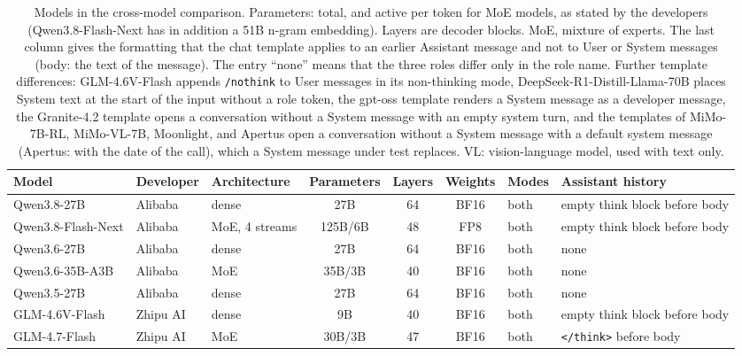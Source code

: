 
\begin{table}[htbp]
\centering
\caption{Models in the cross-model comparison. Parameters: total, and active per token for MoE models, as stated by the developers (Qwen3.8-Flash-Next has in addition a 51B n-gram embedding). Layers are decoder blocks. MoE, mixture of experts. The last column gives the formatting that the chat template applies to an earlier Assistant message and not to User or System messages (body: the text of the message). The entry ``none'' means that the three roles differ only in the role name. Further template differences: GLM-4.6V-Flash appends \texttt{/nothink} to User messages in its non-thinking mode, DeepSeek-R1-Distill-Llama-70B places System text at the start of the input without a role token, the gpt-oss template renders a System message as a developer message, the Granite-4.2 template opens a conversation without a System message with an empty system turn, and the templates of MiMo-7B-RL, MiMo-VL-7B, Moonlight, and Apertus open a conversation without a System message with a default system message (Apertus: with the date of the call), which a System message under test replaces. VL: vision-language model, used with text only.}
\label{tab:self_models}
\scriptsize
\setlength{\tabcolsep}{2.3pt}
\begin{tabular}{ll>{\raggedright\arraybackslash}p{1.65cm}cccl>{\raggedright\arraybackslash}p{2.5cm}}
\toprule
Model & Developer & Architecture & Parameters & Layers & Weights & Modes & Assistant history \\
\midrule
Qwen3.8-27B & Alibaba & dense & 27B & 64 & BF16 & both & empty think block before body \\
Qwen3.8-Flash-Next & Alibaba & MoE, 4 streams & 125B/6B & 48 & FP8 & both & empty think block before body \\
Qwen3.6-27B & Alibaba & dense & 27B & 64 & BF16 & both & none \\
Qwen3.6-35B-A3B & Alibaba & MoE & 35B/3B & 40 & BF16 & both & none \\
Qwen3.5-27B & Alibaba & dense & 27B & 64 & BF16 & both & none \\
GLM-4.6V-Flash & Zhipu AI & dense & 9B & 40 & BF16 & both & empty think block before body \\
GLM-4.7-Flash & Zhipu AI & MoE & 30B/3B & 47 & BF16 & both & \texttt{</think>} before body \\

\end{tabular}
\end{table}
